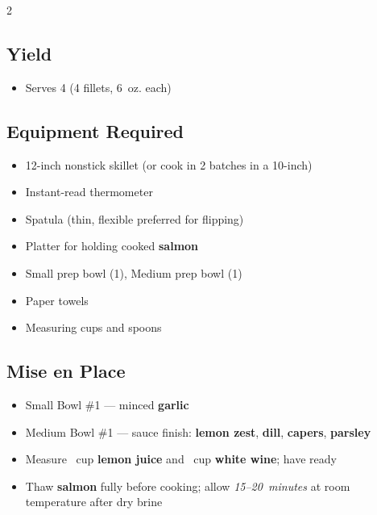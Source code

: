 \documentclass[11pt,letterpaper]{article}
\begin{document}
\newpage

{\footnotesize
\setlength{\columnsep}{20pt}
\setlength{\multicolsep}{6pt}
\begin{multicols}{2}
\setlength{\parindent}{0pt}
\setlength{\parskip}{2pt}
\setlength{\itemsep}{0pt}
\setlength{\parsep}{0pt}

\subsection*{Yield}
\begin{itemize}
    \item Serves 4 (4 fillets, 6~oz. each)
\end{itemize}

\subsection*{Equipment Required}
\begin{itemize}
    \item 12-inch nonstick skillet (or cook in 2 batches in a 10-inch)
    \item Instant-read thermometer
    \item Spatula (thin, flexible preferred for flipping)
    \item Platter for holding cooked \textbf{salmon}
    \item Small prep bowl (1), Medium prep bowl (1)
    \item Paper towels
    \item Measuring cups and spoons
\end{itemize}

\subsection*{Mise en Place}
\begin{itemize}
    \item Small Bowl \#1 --- minced \textbf{garlic}
    \item Medium Bowl \#1 --- sauce finish: \textbf{lemon zest}, \textbf{dill}, \textbf{capers}, \textbf{parsley}
    \item Measure ~cup \textbf{lemon juice} and ~cup \textbf{white wine}; have ready
    \item Thaw \textbf{salmon} fully before cooking; allow \textit{15--20~minutes} at room temperature after dry brine
\end{itemize}


\end{multicols}}
\end{document}
